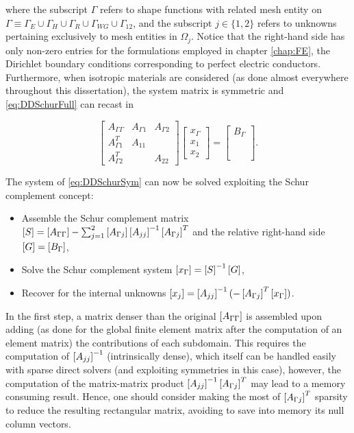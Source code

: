 \noindent where the subscript $\Gamma$ refers to shape functions with related mesh entity on $\Gamma \equiv \Gamma_E \cup \Gamma_H \cup \Gamma_R \cup \Gamma_{WG} \cup \Gamma_{12}$, and the subscript $j \in \lbrace 1,2 \rbrace$ refers to unknowns pertaining exclusively to mesh entities in $\Omega_j$. Notice that the right-hand side has only non-zero entries for the formulations employed in chapter \ref{chap:FE}, the Dirichlet boundary conditions corresponding to perfect electric conductors. Furthermore, when isotropic materials are considered (as done almost everywhere throughout this dissertation), the system matrix is symmetric and \eqref{eq:DDSchurFull} can recast in

\begin{equation}
\label{eq:DDSchurSym}
\begin{bmatrix}
A_{\Gamma\Gamma} & A_{\Gamma1} & A_{\Gamma2}\\
A_{\Gamma1}^T & A_{11} & \\
A_{\Gamma2}^T &  & A_{22}
\end{bmatrix}
\begin{bmatrix}
x_{\Gamma}\\
x_{1}\\
x_{2}
\end{bmatrix}
=
\begin{bmatrix}
B_{\Gamma}\\
\phantom{B}\\
\phantom{B}
\end{bmatrix}.
\end{equation}

The system of \eqref{eq:DDSchurSym} can now be solved exploiting the Schur complement concept:

\begin{itemize}
\item Assemble the Schur complement matrix $\left[S\right] = \left[A_{\Gamma\Gamma}\right] - \sum_{j=1}^2 \left[A_{\Gamma j}\right] \left[A_{jj}\right]^{-1} \left[A_{\Gamma j}\right]^T$ and the relative right-hand side $\left[G\right] = \left[B_{\Gamma}\right]$,
\item Solve the Schur complement system $\left[x_\Gamma\right] = \left[S\right]^{-1} \left[G\right]$,
\item Recover for the internal unknowns $\left[x_j\right] = \left[A_{jj}\right]^{-1} (-\left[A_{\Gamma j}\right]^T \left[x_\Gamma\right])$.
\end{itemize}

In the first step, a matrix denser than the original $\left[A_{\Gamma\Gamma}\right]$ is assembled upon adding (as done for the global finite element matrix after the computation of an element matrix) the contributions of each subdomain. This requires the computation of $\left[A_{jj}\right]^{-1}$ (intrinsically dense), which itself can be handled easily with sparse direct solvers (and exploiting symmetries in this case), however, the computation of the matrix-matrix product $\left[A_{jj}\right]^{-1} \left[A_{\Gamma j}\right]^T$ may lead to a memory consuming result. Hence, one should consider making the most of $\left[A_{\Gamma j}\right]^T$ sparsity to reduce the resulting rectangular matrix, avoiding to save into memory its null column vectors.


